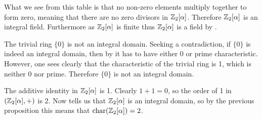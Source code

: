 \begin{questions}
    What we see from this table is that no non-zero elements multiply together to form zero, meaning that there are no zero divisors in $\mathbb{Z}_2[\alpha]$. Therefore $\mathbb{Z}_2[\alpha]$ is an integral field. Furthermore as $\mathbb{Z}_2[\alpha]$ is finite thus $\mathbb{Z}_2[\alpha]$ is a field by .

    \item The trivial ring $\{0\}$ is not an integral domain. Seeking a contradiction, if $\{0\}$ is indeed an integral domain, then by it has to have either 0 or prime characteristic. However, one sees clearly that the characteristic of the trivial ring is 1, which is neither 0 nor prime. Therefore $\{0\}$ is not an integral domain.

    \item The additive identity in $\mathbb{Z}_2[\alpha]$ is 1. Clearly $1 + 1 = 0$, so the order of 1 in $(\mathbb{Z}_2[\alpha],+)$ is 2. Now  tells us that $\mathbb{Z}_2[\alpha]$ is an integral domain, so by the previous proposition this means that $\mathrm{char}(\mathbb{Z}_2[\alpha]) = 2$.
\end{questions}

